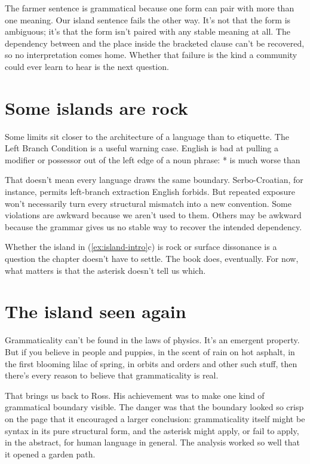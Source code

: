 The farmer sentence is grammatical because one form can pair with more than one meaning. Our island sentence fails the other way. It's not that the form is ambiguous; it's that the form isn't paired with any stable meaning at all. The dependency between  and the place inside the bracketed clause can't be recovered, so no interpretation comes home. Whether that failure is the kind a community could ever learn to hear is the next question.

\section{Some islands are rock}

Some limits sit closer to the architecture of a language than to etiquette. The Left Branch Condition is a useful warning case. English is bad at pulling a modifier or possessor out of the left edge of a noun phrase: * is much worse than 

That doesn't mean every language draws the same boundary. Serbo-Croatian, for instance, permits left-branch extraction English forbids. But repeated exposure won't necessarily turn every structural mismatch into a new convention. Some violations are awkward because we aren't used to them. Others may be awkward because the grammar gives us no stable way to recover the intended dependency.

Whether the island in (\ref{ex:island-intro}c) is rock or surface dissonance is a question the chapter doesn't have to settle. The book does, eventually. For now, what matters is that the asterisk doesn't tell us which.

\section{The island seen again}

Grammaticality can't be found in the laws of physics. It's an emergent property. But if you believe in people and puppies, in the scent of rain on hot asphalt, in the first blooming lilac of spring, in orbits and orders and other such stuff, then there's every reason to believe that grammaticality is real.

That brings us back to Ross. His achievement was to make one kind of grammatical boundary visible. The danger was that the boundary looked so crisp on the page that it encouraged a larger conclusion: grammaticality itself might be syntax in its pure structural form, and the asterisk might apply, or fail to apply, in the abstract, for human language in general. The analysis worked so well that it opened a garden path.

